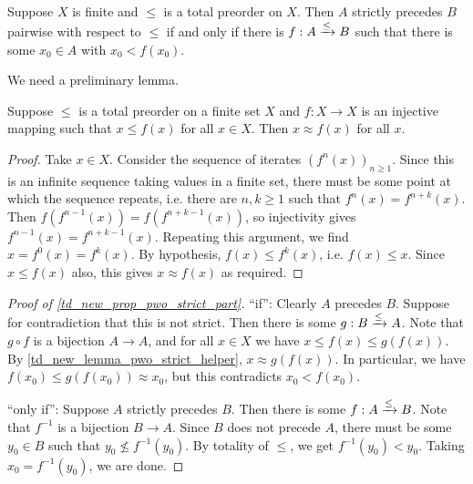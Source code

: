 \begin{proposition}
    \label{td_new_prop_pwo_strict_part}
    Suppose $X$ is finite and $\le$ is a total preorder on $X$. Then $A$
    strictly precedes $B$ pairwise with respect to $\le$ if and only if there
    is ${f}:{A} \xrightarrow{\le} {B}$ such that there is some $x_0 \in A$ with $x_0 <
    f(x_0)$.
\end{proposition}

We need a  preliminary lemma.

\begin{lemma}
    \label{td_new_lemma_pwo_strict_helper}
    Suppose $\le$ is a total preorder on a finite set $X$ and $f: X \to X$ is
    an injective mapping such that $x \le f(x)$ for all $x \in X$. Then $x
    \approx f(x)$ for all $x$.
\end{lemma}

\begin{proof}
    Take $x \in X$. Consider the sequence of iterates $(f^n(x))_{n \ge 1}$.
    Since this is an infinite sequence taking values in a finite set, there
    must be some point at which the sequence repeats, i.e. there are $n, k \ge
    1$ such that $f^n(x) = f^{n + k}(x)$. Then $f(f^{n - 1}(x)) = f(f^{n + k -
    1}(x))$, so injectivity gives $f^{n - 1}(x) = f^{n + k - 1}(x)$. Repeating
    this argument, we find $x = f^0(x) = f^k(x)$. By hypothesis, $f(x) \le
    f^k(x)$, i.e. $f(x) \le x$. Since $x \le f(x)$ also, this gives $x \approx
    f(x)$ as required.
\end{proof}

\begin{proof}[Proof of \cref{td_new_prop_pwo_strict_part}]
    ``if'': Clearly $A$ precedes $B$. Suppose for contradiction that this is not
    strict. Then there is some ${g}:{B} \xrightarrow{\le} {A}$. Note that $g \circ f$
    is a bijection $A \to A$, and for all $x \in X$ we have $x \le f(x) \le
    g(f(x))$. By \cref{td_new_lemma_pwo_strict_helper}, $x \approx g(f(x))$. In
    particular, we have $f(x_0) \le g(f(x_0)) \approx x_0$, but this
    contradicts $x_0 < f(x_0)$.

    ``only if'': Suppose $A$ strictly precedes $B$. Then there is some
    ${f}:{A} \xrightarrow{\le} {B}$. Note that $f^{-1}$ is a bijection $B \to A$.
    Since $B$ does not precede $A$, there must be some $y_0 \in B$ such that
    $y_0 \not\le f^{-1}(y_0)$. By totality of $\le$, we get $f^{-1}(y_0) <
    y_0$. Taking $x_0 = f^{-1}(y_0)$, we are done.
\end{proof}

